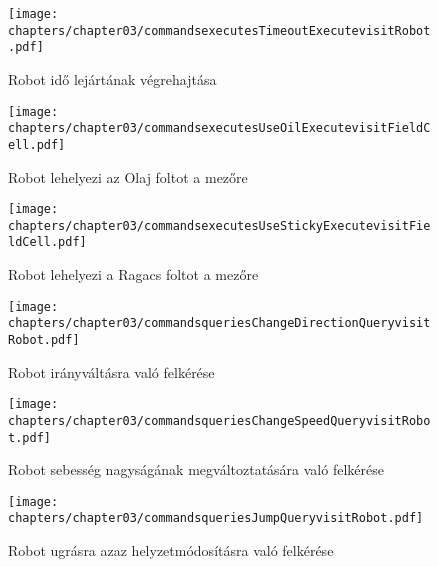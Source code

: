 \begin{figure}[h]
	\begin{center}
		\texttt{[image: chapters/chapter03/commandsexecutesTimeoutExecutevisitRobot.pdf]}
		\caption{Robot idő lejártának végrehajtása}
		\label{fig:command.executes.TimeoutExecute.visit}
	\end{center}
\end{figure}

\begin{figure}[h]
	\begin{center}
		\texttt{[image: chapters/chapter03/commandsexecutesUseOilExecutevisitFieldCell.pdf]}
		\caption{Robot lehelyezi az Olaj foltot a mezőre}
		\label{fig:command.executes.UseOilExecute.visit}
	\end{center}
\end{figure}

\begin{figure}[h]
	\begin{center}
		\texttt{[image: chapters/chapter03/commandsexecutesUseStickyExecutevisitFieldCell.pdf]}
		\caption{Robot lehelyezi a Ragacs foltot a mezőre}
		\label{fig:command.executes.UseStickyExecute.visit}
	\end{center}
\end{figure}

\clearpage

\begin{figure}[h]
	\begin{center}
		\texttt{[image: chapters/chapter03/commandsqueriesChangeDirectionQueryvisitRobot.pdf]}
		\caption{Robot irányváltásra való felkérése}
		\label{fig:command.executes.ChangeDirectionQuery.visit}
	\end{center}
\end{figure}

\begin{figure}[h]
	\begin{center}
		\texttt{[image: chapters/chapter03/commandsqueriesChangeSpeedQueryvisitRobot.pdf]}
		\caption{Robot sebesség nagyságának megváltoztatására való felkérése}
		\label{fig:command.executes.ChangeSpeedQuery.visit}
	\end{center}
\end{figure}

\begin{figure}[h]
	\begin{center}
		\texttt{[image: chapters/chapter03/commandsqueriesJumpQueryvisitRobot.pdf]}
		\caption{Robot ugrásra azaz helyzetmódosításra való felkérése}
		\label{fig:command.executes.JumpQuery.visit}
	\end{center}
\end{figure}

